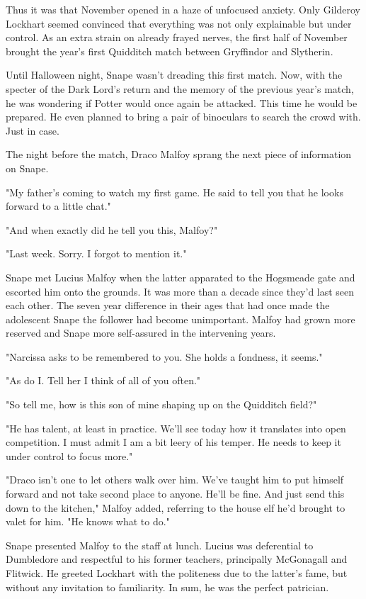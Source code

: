 Thus it was that November opened in a haze of unfocused anxiety. Only Gilderoy Lockhart seemed convinced that everything was not only explainable but under control. As an extra strain on already frayed nerves, the first half of November brought the year's first Quidditch match between Gryffindor and Slytherin.

Until Halloween night, Snape wasn't dreading this first match. Now, with the specter of the Dark Lord's return and the memory of the previous year's match, he was wondering if Potter would once again be attacked. This time he would be prepared. He even planned to bring a pair of binoculars to search the crowd with. Just in case.

The night before the match, Draco Malfoy sprang the next piece of information on Snape.

"My father's coming to watch my first game. He said to tell you that he looks forward to a little chat."

"And when exactly did he tell you this, Malfoy?"

"Last week. Sorry. I forgot to mention it."

Snape met Lucius Malfoy when the latter apparated to the Hogsmeade gate and escorted him onto the grounds. It was more than a decade since they'd last seen each other. The seven year difference in their ages that had once made the adolescent Snape the follower had become unimportant. Malfoy had grown more reserved and Snape more self-assured in the intervening years.

"Narcissa asks to be remembered to you. She holds a fondness, it seems."

"As do I. Tell her I think of all of you often."

"So tell me, how is this son of mine shaping up on the Quidditch field?"

"He has talent, at least in practice. We'll see today how it translates into open competition. I must admit I am a bit leery of his temper. He needs to keep it under control to focus more."

"Draco isn't one to let others walk over him. We've taught him to put himself forward and not take second place to anyone. He'll be fine. And just send this down to the kitchen," Malfoy added, referring to the house elf he'd brought to valet for him. "He knows what to do."

Snape presented Malfoy to the staff at lunch. Lucius was deferential to Dumbledore and respectful to his former teachers, principally McGonagall and Flitwick. He greeted Lockhart with the politeness due to the latter's fame, but without any invitation to familiarity. In sum, he was the perfect patrician.

